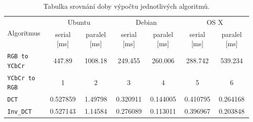 \documentclass[a4paper,11pt]{article}
\begin{document}
\begin{table}[H]
\begin{center}
\renewcommand{\arraystretch}{1.3} %
\begin{tabular}{|l|cc|cc|cc|}\hline%
\multirow{2}{*}{Algoritmus}&\multicolumn{2}{|c|}{Ubuntu}&\multicolumn{2}{|c|}{Debian}&\multicolumn{2}{|c|}{OS X}\\
          &serial [ms]&paralel [ms]&serial [ms]&paralel [ms]&serial [ms]&paralel [ms]\\\hline%
\texttt{RGB to YCbCr}&447.89&1008.18&249.455&260.006&288.742&539.234\\
\texttt{YCbCr to RGB}&1&2&3&4&5&6\\
\texttt{DCT}         &0.527859&1.49798&0.320911&0.144005&0.410795&0.264168\\
\texttt{Inv\_DCT}    &0.527143&1.14584&0.276089&0.113011&0.396967&0.203848\\
\hline
\end{tabular}
\renewcommand{\arraystretch}{1} %
\end{center}
\caption{Tabulka srovnání doby výpočtu jednotlivých algoritmů.}
\label{ps_history}
\end{table}
\end{document}
